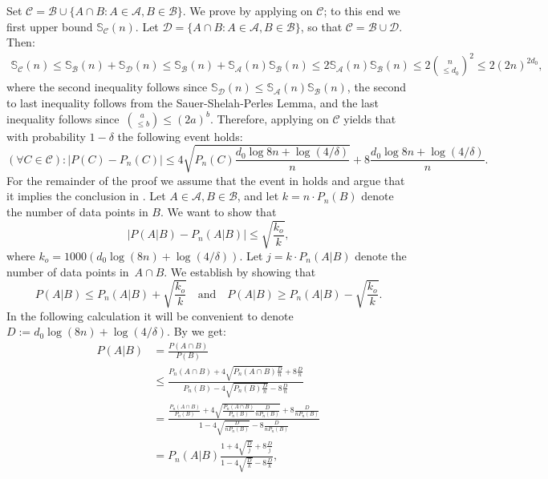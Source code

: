 \documentclass{article}
\def\B{{\mathcal B}}
\newcommand{\cA}{\mathcal{A}}
\newcommand{\cB}{\mathcal{B}}
\newcommand{\cC}{\mathcal{C}}
\begin{document}
Set $\cC = \cB\cup \{A\cap B : A\in\cA, B\in\B\}$. 
We prove  by applying  on $\cC$;
to this end we first upper bound $\mathbb{S}_\cC(n)$.
Let $\mathcal{D}= \{A\cap B :A\in\cA, B\in\cB\}$, so that $\cC = \cB \cup \mathcal{D}$. Then:
\begin{align*}
\mathbb{S}_\cC(n) 
\leq \mathbb{S}_\cB(n) + \mathbb{S}_{\mathcal{D}}(n) \leq \mathbb{S}_\cB(n)  +  \mathbb{S}_\cA(n)\mathbb{S}_\cB(n)\leq 2\mathbb{S}_\cA(n)\mathbb{S}_\cB(n)\leq 2{n \choose \leq d_0}^2\leq 2 (2n)^{2d_0},
\end{align*}
where the second inequality follows since $\mathbb{S}_{\mathcal{D}}(n) \leq \mathbb{S}_\cA(n)\mathbb{S}_\cB(n)$,
the second to last inequality follows from the Sauer-Shelah-Perles Lemma, and the last inequality
follows since~${a \choose \leq b} \leq (2a)^b$.
Therefore, applying  on $\cC$ yields that with probability $1-\delta$ the following event holds:
\begin{equation}\label{eq:BBL}
(\forall C\in \cC): \lvert P(C)- P_n(C) \rvert \leq  4\sqrt{P_n(C)\frac{d_0\log 8n + \log(4/\delta)}{n}} + 8\frac{d_0\log 8n + \log(4/\delta)}{n}. 
\end{equation}
For the remainder of the proof we assume that the event in  holds and argue that it implies
the conclusion in .
Let $A\in\cA, B\in\cB$,  
and let $k=n\cdot P_n(B)$ denote the number of data points in $B$. 
We want to show that
\begin{equation}\label{eq:qed}
\left\lvert P(A \vert B) - P_n(A \vert B) \right\rvert \leq 
\sqrt{\frac{k_o}{k}},
\end{equation}
where $k_o=1000 \left(d_0 \log(8n) + \log(4/\delta)\right)$.
Let $j=k\cdot P_n(A\vert B)$ denote the number of data points in~$A\cap B$.
We establish  by showing that 
\[P(A \vert B) \leq  P_n(A\vert B)  + \sqrt{\frac{k_o}{k}}
~~~\text{ and }~~~ P(A \vert B) \geq  P_n(A\vert B)  - \sqrt{\frac{k_o}{k}}.
\]
In the following calculation it will be convenient to denote $D:=d_0 \log(8n) + \log(4/\delta)$. 
By  we get:
\begin{align*}
P(A \vert B) &= \frac{P(A\cap B)}{P(B)}\\
			 &\leq \frac{P_n(A\cap B) + 4\sqrt{P_n(A\cap B)\frac{D}{n}} + 8\frac{D}{n}}{P_n(B) - 4\sqrt{P_n(B)\frac{D}{n}} - 8\frac{D}{n}}\\
			 &=\frac{\frac{P_n(A\cap B)}{P_n(B)} + 4\sqrt{\frac{P_n(A\cap B)}{P_n(B)}\frac{D}{nP_n(B)}} + 8\frac{D}{nP_n(B)}}{1 - 4\sqrt{\frac{D}{nP_n(B)}} - 8\frac{D}{nP_n(B)}}\\
			 &=P_n(A \vert B)\frac{1+ 4\sqrt{\frac{D}{j}} + 8\frac{D}{j}}{1 - 4\sqrt{\frac{D}{k}} - 8\frac{D}{k}},
\end{align*}
\end{document}
